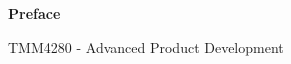 \vspace*{\fill}
{\centering\huge\bfseries Preface \par}

TMM4280 - Advanced Product Development

\vspace*{\fill}